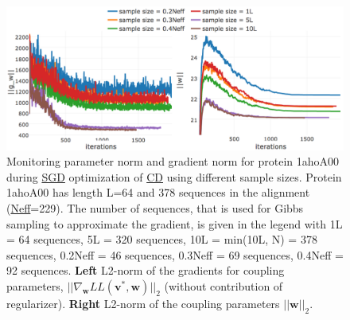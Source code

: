 \documentclass[11pt,a4paper,twoside]{book}
\renewcommand{\v}{\mathbf{v}}
\newcommand{\w}{\mathbf{w}}
\theoremstyle{definition}
\theoremstyle{definition}
\theoremstyle{remark}
\begin{document}
\begin{figure}

{\centering \includegraphics[width=1\linewidth]{img/full_likelihood/appendix/1ahoa00_parameter_gradient_norm_for_samplesizes} 

}

\caption{Monitoring parameter norm and
gradient norm for protein 1ahoA00 during \protect\hyperlink{abbrev}{SGD}
optimization of \protect\hyperlink{abbrev}{CD} using different sample
sizes. Protein 1ahoA00 has length L=64 and 378 sequences in the
alignment (\protect\hyperlink{abbrev}{Neff}=229). The number of
sequences, that is used for Gibbs sampling to approximate the gradient,
is given in the legend with 1L = 64 sequences, 5L = 320 sequences, 10L =
min(10L, N) = 378 sequences, 0.2Neff = 46 sequences, 0.3Neff = 69
sequences, 0.4Neff = 92 sequences. \textbf{Left} L2-norm of the
gradients for coupling parameters, \(||\nabla_{\w} L\!L(\v^*, \w)||_2\)
(without contribution of regularizer). \textbf{Right} L2-norm of the
coupling parameters \(||\w||_2\).}\label{fig:cd-samplesize-protein1ahoa00}
\end{figure}
\end{document}
